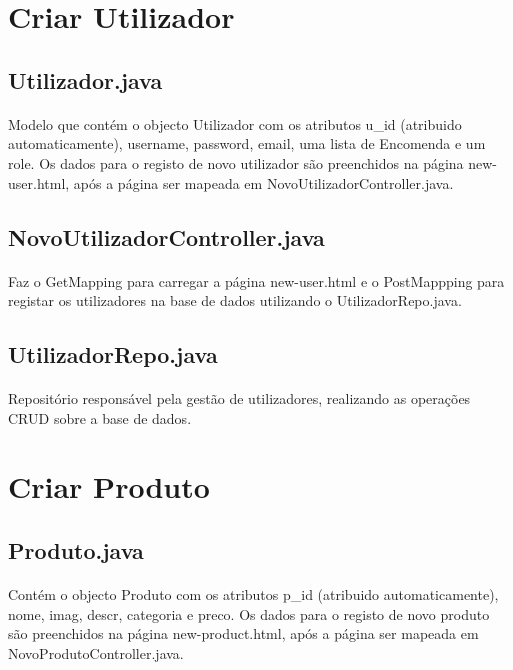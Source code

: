 \documentclass[11pt]{article}
\begin{document}
\newpage
	
\section{Criar Utilizador}
	\subsection{Utilizador.java}
	\paragraph{}
	Modelo que contém o objecto Utilizador com os atributos u\_id (atribuido automaticamente), username, password, email, uma lista de Encomenda e um role. Os dados para o registo de novo utilizador são preenchidos na página new-user.html, após a página ser mapeada em NovoUtilizadorController.java.  

	\subsection{NovoUtilizadorController.java}
	\paragraph{}
	Faz o GetMapping para carregar a página new-user.html e o PostMappping para registar os utilizadores na base de dados utilizando o UtilizadorRepo.java.

	\subsection{UtilizadorRepo.java}
	\paragraph{}
	Repositório responsável pela gestão de utilizadores, realizando as operações CRUD sobre a base de dados.
	
\section{Criar Produto}	
	\subsection{Produto.java}
	\paragraph{}
	Contém o objecto Produto com os atributos p\_id (atribuido automaticamente), nome, imag, descr, categoria e preco. Os dados para o registo de novo produto são preenchidos na página new-product.html, após a página ser mapeada em NovoProdutoController.java. 
	
\end{document}
